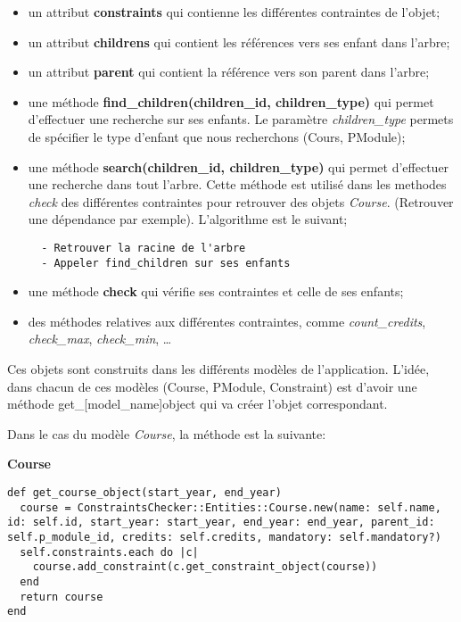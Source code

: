\begin{itemize}
  \item un attribut \textbf{constraints} qui contienne les différentes contraintes de l'objet;
  \item un attribut \textbf{childrens} qui contient les références vers ses enfant dans l'arbre;
  \item un attribut \textbf{parent} qui contient la référence vers son parent dans l'arbre;
  \item une méthode \textbf{find\_children(children\_id, children\_type)} qui permet d'effectuer une recherche sur ses enfants. Le paramètre \textit{children\_type} permets de spécifier le type d'enfant que nous recherchons (Cours, PModule);
  \item une méthode \textbf{search(children\_id, children\_type)} qui permet d'effectuer une recherche dans tout l'arbre. Cette méthode est utilisé dans les methodes \textit{check} des différentes contraintes pour retrouver des objets \textit{Course}. (Retrouver une dépendance par exemple). L'algorithme est le suivant;
  \begin{lstlisting}
  - Retrouver la racine de l'arbre
  - Appeler find_children sur ses enfants
  \end{lstlisting}
  \item une méthode \textbf{check} qui vérifie ses contraintes et celle de ses enfants;
  \item des méthodes relatives aux différentes contraintes, comme \textit{count\_credits}, \textit{check\_max}, \textit{check\_min}, \ldots
\end{itemize}

Ces objets sont construits dans les différents modèles de l'application. L'idée, dans chacun de ces modèles (Course, PModule, Constraint) est d'avoir une méthode get\_[model\_name]object qui va créer l'objet correspondant.

Dans le cas du modèle \textit{Course}, la méthode est la suivante:


\textbf{Course}

\begin{lstlisting}
def get_course_object(start_year, end_year)
  course = ConstraintsChecker::Entities::Course.new(name: self.name, id: self.id, start_year: start_year, end_year: end_year, parent_id: self.p_module_id, credits: self.credits, mandatory: self.mandatory?)
  self.constraints.each do |c|
    course.add_constraint(c.get_constraint_object(course))
  end
  return course
end
\end{lstlisting}



